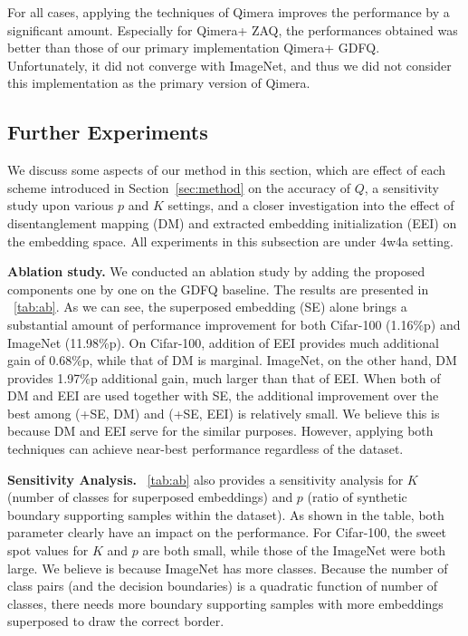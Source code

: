 \documentclass{article}
\newcommand{\aname}{Qimera\xspace}
\newcommand{\rev}[1]{{\color{olivegreen}#1}}
\renewcommand{\rev}[1]{#1}
\begin{document}
{For all cases, applying the techniques of \aname improves the performance by a significant amount.
Especially for \aname+ ZAQ, the performances obtained was better than those of our primary implementation \aname+ GDFQ.
Unfortunately, it did not converge with ImageNet, and thus we did not consider this implementation as the primary version of \aname.


}









\subsection{Further Experiments}
We discuss \rev{some} aspects of our method in this section, which are effect of each scheme introduced in Section~\ref{sec:method} on the accuracy of $Q$, a sensitivity study upon various $p$ and $K$ settings, \rev{and a closer investigation into the effect of disentanglement mapping (DM) and extracted embedding initialization (EEI) on the embedding space}. 
All experiments in this subsection are under 4w4a setting.


\textbf{Ablation study.}
We conducted an ablation study by adding the proposed components one by one on the GDFQ baseline. 
The results are presented in \tablename~\ref{tab:ab}.
As we can see, the superposed embedding (SE) alone brings a substantial amount of performance improvement for both Cifar-100 (1.16\%p) and ImageNet (11.98\%p).
On Cifar-100, addition of EEI provides much additional gain of 0.68\%p, while that of DM is marginal.
ImageNet, on the other hand, DM provides 1.97\%p additional gain, much larger than that of EEI. 
When both of DM and EEI are used together with SE, the additional improvement over the best among (+SE, DM) and (+SE, EEI) is relatively small.
We believe this is because DM and EEI serve for the similar purposes. 
However, applying both techniques can achieve near-best performance regardless of the dataset.




\textbf{Sensitivity Analysis.}
\tablename~\ref{tab:ab} also provides a sensitivity analysis for $K$ (number of classes for superposed embeddings) and $p$ (ratio of synthetic boundary supporting samples within the dataset).
As shown in the table, both parameter clearly have an impact on the performance. 
For Cifar-100, the sweet spot values for $K$ and $p$ are both small, while those of the ImageNet were both large.
We believe is because ImageNet has more classes. 
Because the number of class pairs (and the decision boundaries) is a quadratic function of number of classes, there needs more boundary supporting samples with more embeddings superposed to draw the correct border. 
\end{document}
